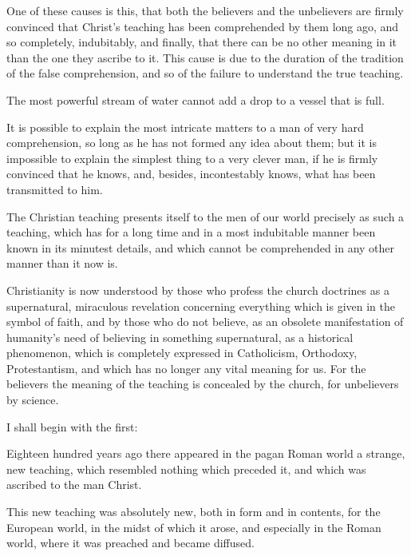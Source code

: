 \documentclass{book}
\begin{document}
One of these causes is this, that both the believers and the unbelievers are firmly convinced that Christ’s teaching has been comprehended by them long ago, and so completely, indubitably, and finally, that there can be no other meaning in it than the one they ascribe to it. This cause is due to the duration of the tradition of the false comprehension, and so of the failure to understand the true teaching.

The most powerful stream of water cannot add a drop to a vessel that is full.

It is possible to explain the most intricate matters to a man of very hard comprehension, so long as he has not formed any idea about them; but it is impossible to explain the simplest thing to a very clever man, if he is firmly convinced that he knows, and, besides, incontestably knows, what has been transmitted to him.

The Christian teaching presents itself to the men of our world precisely as such a teaching, which has for a long time and in a most indubitable manner been known in its minutest details, and which cannot be comprehended in any other manner than it now is.

Christianity is now understood by those who profess the church doctrines as a supernatural, miraculous revelation concerning everything which is given in the symbol of faith, and by those who do not believe, as an obsolete manifestation of humanity’s need of believing in something supernatural, as a historical phenomenon, which is completely expressed in Catholicism, Orthodoxy, Protestantism, and which has no longer any vital meaning for us. For the believers the meaning of the teaching is concealed by the church, for unbelievers by science.

I shall begin with the first:

Eighteen hundred years ago there appeared in the pagan Roman world a strange, new teaching, which resembled nothing which preceded it, and which was ascribed to the man Christ.

This new teaching was absolutely new, both in form and in contents, for the European world, in the midst of which it arose, and especially in the Roman world, where it was preached and became diffused.
\end{document}
